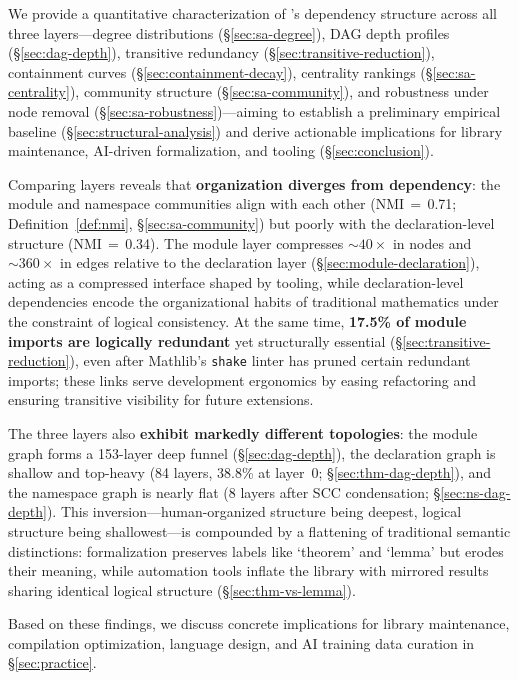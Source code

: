 We provide a quantitative characterization of 's dependency structure across all three layers---degree distributions (\S\ref{sec:sa-degree}), DAG depth profiles (\S\ref{sec:dag-depth}), transitive redundancy (\S\ref{sec:transitive-reduction}), containment curves (\S\ref{sec:containment-decay}), centrality rankings (\S\ref{sec:sa-centrality}), community structure (\S\ref{sec:sa-community}), and robustness under node removal (\S\ref{sec:sa-robustness})---aiming to establish a preliminary empirical baseline (\S\ref{sec:structural-analysis}) and derive actionable implications for library maintenance, AI-driven formalization, and tooling (\S\ref{sec:conclusion}).

Comparing layers reveals that \textbf{organization diverges from dependency}: the module and namespace communities align with each other (NMI\,$=$\,0.71; Definition~\ref{def:nmi}, \S\ref{sec:sa-community}) but poorly with the declaration-level structure (NMI\,$=$\,0.34). The module layer compresses ${\sim}40\times$ in nodes and ${\sim}360\times$ in edges relative to the declaration layer (\S\ref{sec:module-declaration}), acting as a compressed interface shaped by tooling, while declaration-level dependencies encode the organizational habits of traditional mathematics under the constraint of logical consistency. At the same time, \textbf{17.5\% of module imports are logically redundant} yet structurally essential (\S\ref{sec:transitive-reduction}), even after Mathlib's \texttt{shake} linter has pruned certain redundant imports; these links serve development ergonomics by easing refactoring and ensuring transitive visibility for future extensions.

The three layers also \textbf{exhibit markedly different topologies}: the module graph forms a 153-layer deep funnel (\S\ref{sec:dag-depth}), the declaration graph is shallow and top-heavy (84 layers, 38.8\% at layer~0; \S\ref{sec:thm-dag-depth}), and the namespace graph is nearly flat (8 layers after SCC condensation; \S\ref{sec:ns-dag-depth}). This inversion---human-organized structure being deepest, logical structure being shallowest---is compounded by a flattening of traditional semantic distinctions: formalization preserves labels like `theorem' and `lemma' but erodes their meaning, while automation tools inflate the library with mirrored results sharing identical logical structure (\S\ref{sec:thm-vs-lemma}).

Based on these findings, we discuss concrete implications for library maintenance, compilation optimization, language design, and AI training data curation in \S\ref{sec:practice}.

